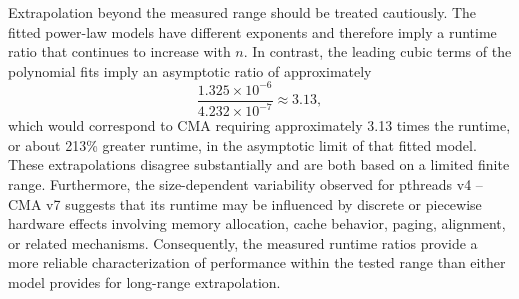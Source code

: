 Extrapolation beyond the measured range should be treated cautiously. The fitted power-law models have different exponents and therefore imply a runtime ratio that continues to increase with $n$. In contrast, the leading cubic terms of the polynomial fits imply an asymptotic ratio of approximately
$$
\frac{1.325\times10^{-6}}{4.232\times10^{-7}}\approx 3.13,
$$
which would correspond to CMA requiring approximately 3.13 times the runtime, or about 213\% greater runtime, in the asymptotic limit of that fitted model. These extrapolations disagree substantially and are both based on a limited finite range. Furthermore, the size-dependent variability observed for pthreads v4 -- CMA v7 suggests that its runtime may be influenced by discrete or piecewise hardware effects involving memory allocation, cache behavior, paging, alignment, or related mechanisms. Consequently, the measured runtime ratios provide a more reliable characterization of performance within the tested range than either model provides for long-range extrapolation.

\begin{table}[!t]
\centering
\caption{Windows WSL Experiments -- Summary statistics by method.}
\label{tab:pthreads-wsl-summary}
\footnotesize
{}
\end{table}

\begin{table}[!t]
\centering
\caption{Windows WSL Experiments -- Shapiro--Wilk, Levene, and one-way ANOVA results.}
\label{tab:pthreads-wsl-tests}
\footnotesize
{}
\end{table}


